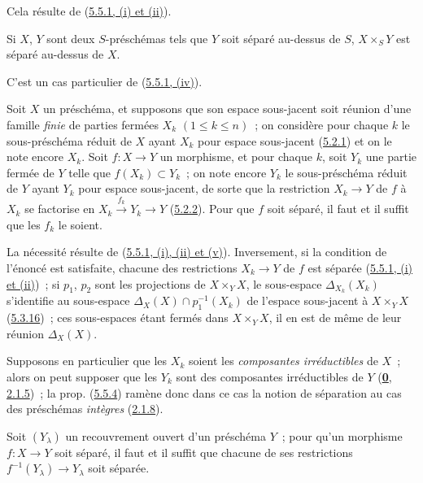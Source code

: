 Cela résulte de (\hyperref[I.5.5.1-fr]{5.5.1, (i) et (ii)}).

\begin{corollary}[5.5.3]
\label{I.5.5.3-fr}
Si $X$, $Y$ sont deux $S$-préschémas tels que $Y$ soit séparé au-dessus de
$S$, $X\times_S Y$ est séparé au-dessus de $X$.
\end{corollary}

C'est un cas particulier de (\hyperref[I.5.5.1-fr]{5.5.1, (iv)}).

\begin{proposition}[5.5.4]
\label{I.5.5.4-fr}
Soit $X$ un préschéma, et supposons que son espace sous-jacent soit réunion
d'une famille \emph{finie} de parties fermées $X_k$ $(1\leq k\leq n)$~; on considère
pour chaque $k$ le sous-préschéma réduit de $X$ ayant $X_k$ pour espace
sous-jacent \textup{(\hyperref[I.5.2.1-fr]{5.2.1})} et on le note encore $X_k$. Soit
$f:X\to Y$ un morphisme, et pour chaque $k$, soit $Y_k$ une partie fermée de
$Y$ telle que $f(X_k)\subset Y_k$~; on note encore $Y_k$ le sous-préschéma
réduit de $Y$ ayant $Y_k$ pour espace sous-jacent, de sorte que la restriction
$X_k\to Y$ de $f$ à $X_k$ se factorise en
$X_k\xrightarrow{f_k}Y_k\to Y$ \textup{(\hyperref[I.5.2.2-fr]{5.2.2})}. Pour que $f$
soit séparé, il faut et il suffit que les $f_k$ le soient.
\end{proposition}

La nécessité résulte de
(\hyperref[I.5.5.1-fr]{5.5.1, (i), (ii) et (v)}). Inversement, si la condition
de l'énoncé est satisfaite, chacune des restrictions $X_k\to Y$ de $f$ est
séparée (\hyperref[I.5.5.1-fr]{5.5.1, (i) et (ii)})~; si $p_1$, $p_2$ sont les
projections de $X\times_Y X$, le sous-espace $\Delta_{X_k}(X_k)$ s'identifie
au sous-espace $\Delta_X(X)\cap p_1^{-1}(X_k)$ de l'espace sous-jacent à
$X\times_Y X$ (\hyperref[I.5.3.16-fr]{5.3.16})~; ces sous-espaces étant
fermés dans $X\times_Y X$, il en est de même de leur réunion $\Delta_X(X)$.

Supposons en particulier que les $X_k$ soient les
\emph{composantes irréductibles} de $X$~; alors on peut supposer que les $Y_k$
sont des composantes irréductibles de $Y$
(\hyperref[0.2.1.5-fr]{\textbf{0}, 2.1.5})~; la prop.
(\hyperref[I.5.5.4-fr]{5.5.4}) ramène donc dans ce cas la notion de séparation
au cas des préschémas \emph{intègres} (\hyperref[I.2.1.8-fr]{2.1.8}).


\begin{proposition}[5.5.5]
\label{I.5.5.5-fr}
Soit $(Y_\lambda)$ un recouvrement ouvert d'un préschéma $Y$~; pour qu'un
morphisme $f:X\to Y$ soit séparé, il faut et il suffit que chacune de ses
restrictions $f^{-1}(Y_\lambda)\to Y_\lambda$ soit séparée.
\end{proposition}

